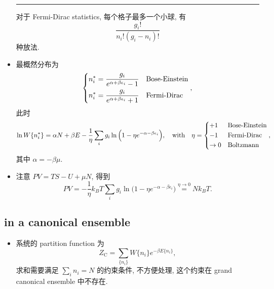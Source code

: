 \begin{itemize}
\begin{tcolorbox}[title=calculation:]
		\noindent\rule[0.5ex]{\linewidth}{0.5pt} %
		
		对于 Fermi-Dirac statistics, 每个格子最多一个小球, 有
		\begin{equation}
			\frac{g_i!}{n_i! (g_i - n_i)!}
		\end{equation}
		种放法.
	\end{tcolorbox}
	
	\item 最概然分布为
	\begin{equation}
		\begin{dcases}
			n_i^* = \frac{g_i}{e^{\alpha + \beta \epsilon_i} - 1} & \text{Bose-Einstein} \\
			n_i^* = \frac{g_i}{e^{\alpha + \beta \epsilon_i} + 1} & \text{Fermi-Dirac}
		\end{dcases},
	\end{equation}
	此时
	\begin{equation}
		\ln W\{n_i^*\} = \alpha N + \beta E - \frac{1}{\eta} \sum_i g_i \ln \Big( 1 - \eta e^{- \alpha - \beta \epsilon_i} \Big), \quad \text{with} \quad \eta = \begin{dcases}
			+ 1 & \text{Bose-Einstein} \\
			- 1 & \text{Fermi-Dirac} \\
			\rightarrow 0 & \text{Boltzmann}
		\end{dcases},
	\end{equation}
	其中 $\alpha = - \beta \mu$.
	
	\item 注意 $P V = T S - U + \mu N$, 得到
	\begin{equation}
		P V = - \frac{1}{\eta} k_B T \sum_i g_i \ln \Big( 1 - \eta e^{- \alpha - \beta \epsilon_i} \Big) \overset{\eta \rightarrow 0}{=} N k_B T.
	\end{equation}
\end{itemize}

\subsection{in a canonical ensemble}
\begin{itemize}
	\item 系统的 partition function 为
	\begin{equation}
		Z_\text{C} = \sum_{\{n_i\}} W\{n_i\} e^{- \beta E\{n_i\}},
	\end{equation}
	求和需要满足 $\sum_i n_i = N$ 的约束条件, 不方便处理, 这个约束在 grand canonical ensemble 中不存在.
\end{itemize}

